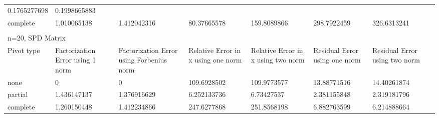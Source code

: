 \documentclass[12pt, letterpaper]{article}
\begin{document}
\begin{table}[h]
{{\begin{tabular}{llllllll}
      \multicolumn{1}{l|}{0.1765277698} &
      \multicolumn{1}{l|}{0.1998665883} &
       \\ \cline{1-7}
    \multicolumn{1}{|l|}{complete} &
      \multicolumn{1}{l|}{1.010065138} &
      \multicolumn{1}{l|}{1.412042316} &
      \multicolumn{1}{l|}{80.37665578} &
      \multicolumn{1}{l|}{159.8089866} &
      \multicolumn{1}{l|}{298.7922459} &
      \multicolumn{1}{l|}{326.6313241} &
       \\ \cline{1-7}
     &
       &
       &
       &
       &
       &
       &
       \\ \cline{1-7}
    \multicolumn{7}{|l|}{n=20, SPD Matrix} &
       \\ \cline{1-7}
    \multicolumn{1}{|l|}{Pivot type} &
      \multicolumn{1}{l|}{Factorization Error using 1 norm} &
      \multicolumn{1}{l|}{Factorization Error using Forbenius norm} &
      \multicolumn{1}{l|}{Relative Error in x using one norm} &
      \multicolumn{1}{l|}{Relative Error in x using two norm} &
      \multicolumn{1}{l|}{Residual Error using one norm} &
      \multicolumn{1}{l|}{Residual Error using two norm} &
       \\ \cline{1-7}
    \multicolumn{1}{|l|}{none} &
      \multicolumn{1}{l|}{0} &
      \multicolumn{1}{l|}{0} &
      \multicolumn{1}{l|}{109.6928502} &
      \multicolumn{1}{l|}{109.9773577} &
      \multicolumn{1}{l|}{13.88771516} &
      \multicolumn{1}{l|}{14.40261874} &
       \\ \cline{1-7}
    \multicolumn{1}{|l|}{partial} &
      \multicolumn{1}{l|}{1.436147137} &
      \multicolumn{1}{l|}{1.376916629} &
      \multicolumn{1}{l|}{6.252133736} &
      \multicolumn{1}{l|}{6.73427537} &
      \multicolumn{1}{l|}{2.381155848} &
      \multicolumn{1}{l|}{2.319181796} &
       \\ \cline{1-7}
    \multicolumn{1}{|l|}{complete} &
      \multicolumn{1}{l|}{1.260150448} &
      \multicolumn{1}{l|}{1.412234866} &
      \multicolumn{1}{l|}{247.6277868} &
      \multicolumn{1}{l|}{251.8568198} &
      \multicolumn{1}{l|}{6.882763599} &
      \multicolumn{1}{l|}{6.214888664} &
       \\ \cline{1-7}
    
    \end{tabular}
    }}
    \end{table}
\end{document}
